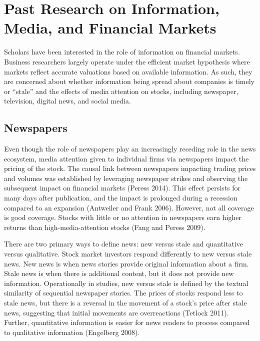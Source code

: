 \documentclass[12pt,]{article}
\begin{document}
\hypertarget{past-research-on-information-media-and-financial-markets}{%
\section{Past Research on Information, Media, and Financial
Markets}\label{past-research-on-information-media-and-financial-markets}}

Scholars have been interested in the role of information on financial
markets. Business researchers largely operate under the efficient market
hypothesis where markets reflect accurate valuations based on available
information. As such, they are concerned about whether information being
spread about companies is timely or ``stale'' and the effects of media
attention on stocks, including newspaper, television, digital news, and
social media.

\hypertarget{newspapers}{%
\subsection{Newspapers}\label{newspapers}}

Even though the role of newspapers play an increasingly receding role in
the news ecosystem, media attention given to individual firms via
newspapers impact the pricing of the stock. The causal link between
newspapers impacting trading prices and volumes was established by
leveraging newspaper strikes and observing the subsequent impact on
financial markets (Peress 2014). This effect persists for many days
after publication, and the impact is prolonged during a recession
compared to an expansion (Antweiler and Frank 2006). However, not all
coverage is good coverage. Stocks with little or no attention in
newspapers earn higher returns than high-media-attention stocks (Fang
and Peress 2009).

There are two primary ways to define news: new versus stale and
quantitative versus qualitative. Stock market investors respond
differently to new versus stale news. New news is when news stories
provide original information about a firm. Stale news is when there is
additional content, but it does not provide new information.
Operationally in studies, new versus stale is defined by the textual
similarity of sequential newspaper stories. The prices of stocks respond
less to stale news, but there is a reversal in the movement of a stock's
price after stale news, suggesting that initial movements are
overreactions (Tetlock 2011). Further, quantitative information is
easier for news readers to process compared to qualitative information
(Engelberg 2008).
\end{document}
